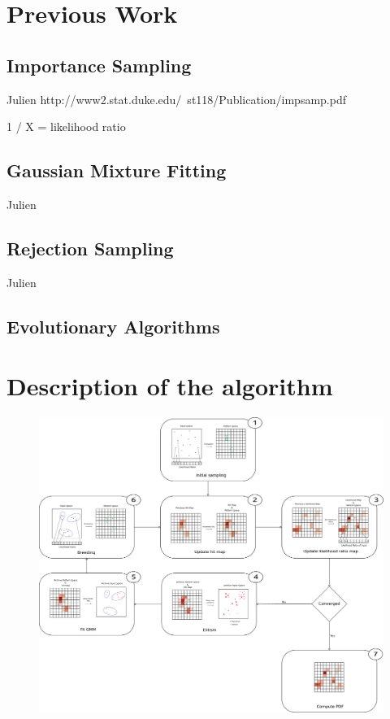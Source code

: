 \documentclass[10pt,a4paper]{article}
\theoremstyle{definition}
\theoremstyle{remark}
\begin{document}
\section{Previous Work}

\subsection{Importance Sampling}

{\color{red} Julien} 
http://www2.stat.duke.edu/~st118/Publication/impsamp.pdf


1 / X = likelihood ratio

\subsection{Gaussian Mixture Fitting}

{\color{red} Julien} 

\subsection{Rejection Sampling}

{\color{red} Julien} 

\subsection{Evolutionary Algorithms}



\section{Description of the algorithm}\label{sec. algoDescription}



\begin{figure}
 \centering
  \includegraphics[width=0.8\linewidth]{images/schemaalgo.pdf}%
\end{figure}
\end{document}
